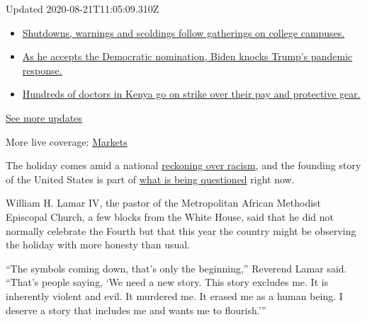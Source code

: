 Updated 2020-08-21T11:05:09.310Z

\begin{itemize}
\tightlist
\item
  \href{https://www.nytimes3xbfgragh.onion/2020/08/21/world/covid-19-coronavirus.html?action=click\&pgtype=Article\&state=default\&region=MAIN_CONTENT_1\&context=storylines_live_updates\#link-4690b6aa}{Shutdowns,
  warnings and scoldings follow gatherings on college campuses.}
\item
  \href{https://www.nytimes3xbfgragh.onion/2020/08/21/world/covid-19-coronavirus.html?action=click\&pgtype=Article\&state=default\&region=MAIN_CONTENT_1\&context=storylines_live_updates\#link-324af071}{As
  he accepts the Democratic nomination, Biden knocks Trump's pandemic
  response.}
\item
  \href{https://www.nytimes3xbfgragh.onion/2020/08/21/world/covid-19-coronavirus.html?action=click\&pgtype=Article\&state=default\&region=MAIN_CONTENT_1\&context=storylines_live_updates\#link-35890b73}{Hundreds
  of doctors in Kenya go on strike over their pay and protective gear.}
\end{itemize}

\href{https://www.nytimes3xbfgragh.onion/2020/08/21/world/covid-19-coronavirus.html?action=click\&pgtype=Article\&state=default\&region=MAIN_CONTENT_1\&context=storylines_live_updates}{See
more updates}

More live coverage:
\href{https://www.nytimes3xbfgragh.onion/live/2020/08/20/business/stock-market-today-coronavirus?action=click\&pgtype=Article\&state=default\&region=MAIN_CONTENT_1\&context=storylines_live_updates}{Markets}

The holiday comes amid a national
\href{https://www.nytimes3xbfgragh.onion/interactive/2020/06/24/magazine/reparations-slavery.html?searchResultPosition=3}{reckoning
over racism}, and the founding story of the United States is part of
\href{https://www.nytimes3xbfgragh.onion/interactive/2019/08/14/magazine/black-history-american-democracy.html}{what
is being questioned} right now.

William H. Lamar IV, the pastor of the Metropolitan African Methodist
Episcopal Church, a few blocks from the White House, said that he did
not normally celebrate the Fourth but that this year the country might
be observing the holiday with more honesty than usual.

``The symbols coming down, that's only the beginning,'' Reverend Lamar
said. ``That's people saying, `We need a new story. This story excludes
me. It is inherently violent and evil. It murdered me. It erased me as a
human being. I deserve a story that includes me and wants me to
flourish.'''

